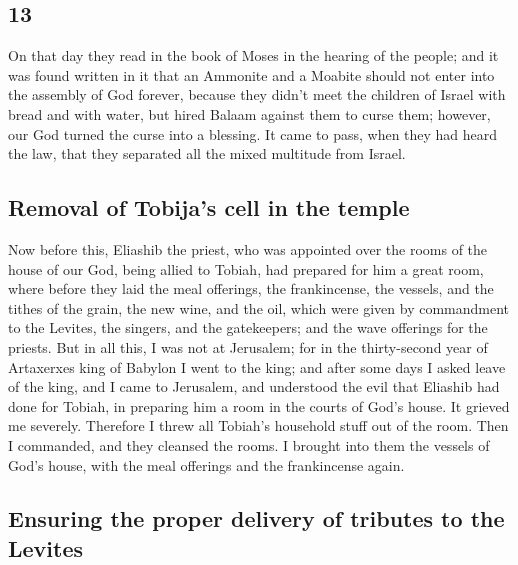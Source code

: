 \begin{paracol}{2}
\begin{otherlanguage}{english}
{\section{13}\label{section-25}}

 On that day they read in the book of Moses in the hearing
of the people; and it was found written in it that an Ammonite and a
Moabite should not enter into the assembly of God forever,
 because they didn't meet the children of Israel with
bread and with water, but hired Balaam against them to curse them;
however, our God turned the curse into a blessing.  It
came to pass, when they had heard the law, that they separated all the
mixed multitude from Israel.

\hypertarget{removal-of-tobijas-cell-in-the-temple}{%
\subsection{Removal of Tobija's cell in the
temple}\label{removal-of-tobijas-cell-in-the-temple}}

 Now before this, Eliashib the priest, who was appointed
over the rooms of the house of our God, being allied to Tobiah,
 had prepared for him a great room, where before they laid
the meal offerings, the frankincense, the vessels, and the tithes of the
grain, the new wine, and the oil, which were given by commandment to the
Levites, the singers, and the gatekeepers; and the wave offerings for
the priests.  But in all this, I was not at Jerusalem; for
in the thirty-second year of Artaxerxes king of Babylon I went to the
king; and after some days I asked leave of the king,  and
I came to Jerusalem, and understood the evil that Eliashib had done for
Tobiah, in preparing him a room in the courts of God's house.
 It grieved me severely. Therefore I threw all Tobiah's
household stuff out of the room.  Then I commanded, and
they cleansed the rooms. I brought into them the vessels of God's house,
with the meal offerings and the frankincense again.

\hypertarget{ensuring-the-proper-delivery-of-tributes-to-the-levites}{%
\subsection{Ensuring the proper delivery of tributes to the
Levites}\label{ensuring-the-proper-delivery-of-tributes-to-the-levites}}


\end{otherlanguage}
\end{paracol}

